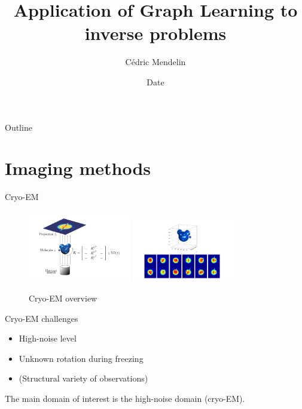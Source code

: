 \documentclass[aspectratio=169]{beamer}
\title              {Application of Graph Learning to inverse problems}
\author     		{Cédric Mendelin}
\institute          {Department of Mathematics and Computer Science, University of Basel}
\date               {Date}
\begin{document}
\begin{frame}[t,plain]
    \titlepage
\end{frame}

\begin{frame}[t]{Outline}
    \tableofcontents
\end{frame}


\section{Imaging methods}	%

\begin{frame}[c]{Cryo-EM}
    \begin{figure}
        \includegraphics[width=0.4\textwidth]{cryo-EM-overview.png}
        \includegraphics[width=0.4\textwidth]{micky-mouse.png}
        \caption{Cryo-EM overview \cite[Figure 1 and Figure 2]{cryoEmMath2}}
    \end{figure}

\end{frame}

\begin{frame}[c]{Cryo-EM challenges}
    \begin{itemize}
        \item High-noise level 
        \item Unknown rotation during freezing
        \item (Structural variety of observations)
    \end{itemize}

    
    \begin{tcolorbox}[colback=red!5!white,colframe=red!75!black]
        The main domain of interest is the high-noise domain (cryo-EM).
    \end{tcolorbox}

\end{frame}
\end{document}
